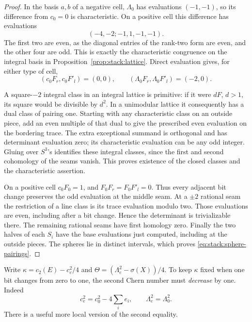 \begin{proof}
In the basis \(a,b\) of a negative cell, \(\Lambda_0\) has
evaluations \((-1,-1)\), so its difference from \(c_0=0\) is
characteristic.  On a positive cell this difference has evaluations
\[
 (-4,-2;-1,1,-1,-1).
\]
The first two are even, as the diagonal entries of the rank-two form
are even, and the other four are odd.  This is exactly the
characteristic congruence on the integral basis in
Proposition~\ref{prop:stack:lattice}.  Direct evaluation gives, for
either type of cell,
\[
 (c_0F_r,c_0F'_l)=(0,0),\qquad
 (\Lambda_0F_r,\Lambda_0F'_l)=(-2,0).
\]

A square-\(-2\) integral class in an integral lattice is primitive:
if it were \(dF\), \(d>1\), its square would be divisible by
\(d^2\).  In a unimodular lattice it consequently has a dual class
of pairing one.  Starting with any characteristic class on an outside
piece, add an even multiple of that dual to give the prescribed even
evaluation on the bordering trace.  The extra exceptional summand is
orthogonal and has determinant evaluation zero; its characteristic
evaluation can be any odd integer.  Gluing over \(S^3\)'s identifies
these integral classes, since the first and second cohomology of the
seams vanish.  This proves existence of the closed classes and the
characteristic assertion.

On a positive cell \(c_0F_0=1\), and
\(F_0F_r=F_0F'_l=0\).  Thus every adjacent bit change preserves the
odd evaluation at the middle seam.  At a \(\pm2\) rational seam the
restriction of a line class is its trace evaluation modulo two.
Those evaluations are even, including after a bit change.  Hence the
determinant is trivializable there.  The remaining rational seams have
first homology zero.  Finally the two halves of each \(S_i\) have the
base evaluations just computed, including at the outside pieces.
The spheres lie in distinct intervals, which proves
\eqref{eq:stack:sphere-pairings}.
\end{proof}

Write
\(\kappa=c_2(E)-c_e^2/4\) and
\(\Theta=(\Lambda_e^2-\sigma(X))/4\).  To keep \(\kappa\) fixed
when one bit changes from zero to one, the second Chern number must
\emph{decrease} by one.  Indeed
\begin{equation}
 c_e^2=c_0^2-4\sum_i e_i,\qquad
 \Lambda_e^2=\Lambda_0^2.
\label{eq:stack:global-bit-squares}
\end{equation}
There is a useful more local version of the second equality.

